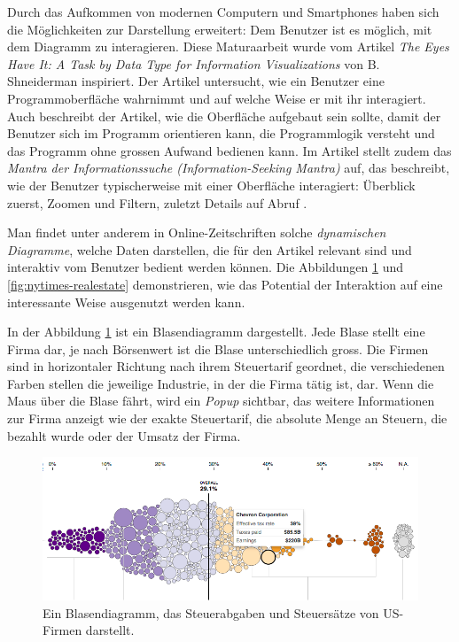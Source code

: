 Durch das Aufkommen von modernen Computern und Smartphones haben sich die Möglichkeiten zur Darstellung erweitert: Dem Benutzer ist es möglich, mit dem Diagramm zu interagieren. Diese Maturaarbeit wurde vom Artikel \textit{The Eyes Have It: A Task by Data Type for Information Visualizations} von B. Shneiderman \cite{shneiderman} inspiriert. Der Artikel untersucht, wie ein Benutzer eine Programmoberfläche wahrnimmt und auf welche Weise er mit ihr interagiert. Auch beschreibt der Artikel, wie die Oberfläche aufgebaut sein sollte, damit der Benutzer sich im Programm orientieren kann, die Programmlogik versteht und das Programm ohne grossen Aufwand bedienen kann. Im Artikel stellt \citeauthor{shneiderman} zudem das \textit{Mantra der Informationssuche (Information-Seeking Mantra)} auf, das beschreibt, wie der Benutzer typischerweise mit einer Oberfläche interagiert: Überblick zuerst, Zoomen und Filtern, zuletzt Details auf Abruf \cite{shneiderman}.

Man findet unter anderem in Online-Zeitschriften solche \textit{dynamischen Diagramme}, welche Daten darstellen, die für den Artikel relevant sind und interaktiv vom Benutzer bedient werden können. Die Abbildungen \ref{fig:nytimes-taxes} und \ref{fig:nytimes-realestate} demonstrieren, wie das Potential der Interaktion auf eine interessante Weise ausgenutzt werden kann.

In der Abbildung \ref{fig:nytimes-taxes} ist ein Blasendiagramm dargestellt. Jede Blase stellt eine Firma dar, je nach Börsenwert ist die Blase unterschiedlich gross. Die Firmen sind in horizontaler Richtung nach ihrem Steuertarif geordnet, die verschiedenen Farben stellen die jeweilige Industrie, in der die Firma tätig ist, dar. Wenn die Maus über die Blase fährt, wird ein \textit{Popup} sichtbar, das weitere Informationen zur Firma anzeigt wie der exakte Steuertarif, die absolute Menge an Steuern, die bezahlt wurde oder der Umsatz der Firma.

\begin{figure}[H]
	\centering
	\includegraphics[width=\linewidth]{images/nytimes-taxes-zugeschnitten}
	\caption[Blasendiagramm in The New York Times ()]{Ein Blasendiagramm, das Steuerabgaben und Steuersätze von US-Firmen darstellt. \cite{nytimes-taxes}}
	\label{fig:nytimes-taxes}
\end{figure}

